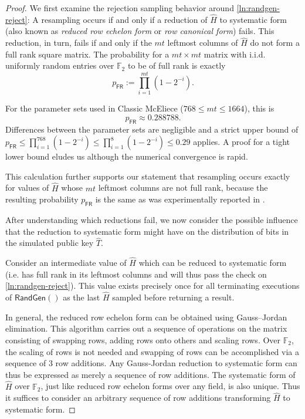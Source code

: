 \begin{proof}
    We first examine the rejection sampling behavior around \cref{ln:randgen-reject}: A resampling occurs if and only if a reduction of $\hat H$ to systematic form (also known as \emph{reduced row echelon form} or \emph{row canonical form}) fails. This reduction, in turn, fails if and only if the $mt$ leftmost columns of $\hat H$ do not form a full rank square matrix.
    The probability for a $mt \times mt$ matrix with i.i.d. uniformly random entries over $\mathbb F_2$ to be of full rank is exactly~\cite{DBLP:journals/corr/SalmondGGC14}
    \[ p_\mathsf{FR} := \prod_{i=1}^{mt} \left( 1-2^{-i} \right). \]
    
    For the parameter sets used in Classic McEliece ($768 \leq mt \leq 1664$), this is \[ p_\mathsf{FR} \approx 0.288788 . \]
    Differences between the parameter sets are negligible and a strict upper bound of $p_\mathsf{FR} \leq \prod_{i=1}^{768} \left( 1-2^{-i} \right) \leq \prod_{i=1}^{8} \left( 1-2^{-i} \right) \leq 0.29$ applies. A proof for a tight lower bound eludes us although the numerical convergence is rapid.
    
    This calculation further supports our statement that resampling occurs exactly for values of $\hat H$ whose $mt$ leftmost columns are not full rank, because the resulting probability $p_\mathsf{FR}$ is the same as was experimentally reported in \cite[security.pdf:~Section~4.2]{NISTPQC-R4:ClassicMcEliece22}.
    
    After understanding which reductions fail, we now consider the possible influence that the reduction to systematic form might have on the distribution of bits in the simulated public key $\hat T$.

    Consider an intermediate value of $\hat H$ which can be reduced to systematic form (i.e. has full rank in its leftmost columns and will thus pass the check on \cref{ln:randgen-reject}). This value exists precisely once for all terminating executions of $\mathsf{RandGen}()$ as the last $\hat H$ sampled before returning a result.

    In general, the reduced row echelon form can be obtained using Gauss–Jordan elimination. This algorithm carries out a sequence of operations on the matrix consisting of swapping rows, adding rows onto others and scaling rows.
    Over $\mathbb F_2$, the scaling of rows is not needed and swapping of rows can be accomplished via a sequence of 3 row additions. Any Gauss-Jordan reduction to systematic form can thus be expressed as merely a sequence of row additions.
    The systematic form of $\hat H$ over $\mathbb F_2$, just like reduced row echelon forms over any field, is also unique. Thus it suffices to consider an arbitrary sequence of row additions transforming $\hat H$ to systematic form.


\end{proof}
